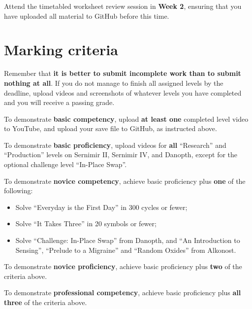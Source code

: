 \documentclass{../../../fal_assignment}
\begin{document}
Attend the timetabled worksheet review session in \textbf{Week 2},
ensuring that you have uploaded all material to GitHub before this time.

\section*{Marking criteria}

Remember that \textbf{it is better to submit incomplete work than to submit nothing at all}. If you do not manage to finish all assigned levels by the deadline, upload videos and screenshots of whatever levels you have completed and you will receive a passing grade.

To demonstrate \textbf{basic competency}, upload \textbf{at least one} completed level video to YouTube, and upload your save file to GitHub, as instructed above.

To demonstrate \textbf{basic proficiency}, upload videos for \textbf{all} ``Research'' and ``Production'' levels on Sernimir II, Sernimir IV, and Danopth, except for the optional challenge level ``In-Place Swap''.

To demonstrate \textbf{novice competency}, achieve basic proficiency plus \textbf{one} of the following:
	\begin{itemize}
		\item Solve ``Everyday is the First Day'' in 300 cycles or fewer;
		\item Solve ``It Takes Three'' in 20 symbols or fewer;
		\item Solve ``Challenge: In-Place Swap'' from Danopth, and ``An Introduction to Sensing'', ``Prelude to a Migraine'' and ``Random Oxides'' from Alkonost.
	\end{itemize}

To demonstrate \textbf{novice proficiency}, achieve basic proficiency plus \textbf{two} of the criteria above.

To demonstrate \textbf{professional competency}, achieve basic proficiency plus \textbf{all three} of the criteria above.
\end{document}
